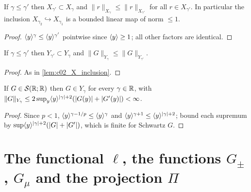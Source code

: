 \begin{lemma}
  \label{lem:c02_X_inclusion}
  If $\gamma\le\gamma'$ then $X_{\gamma'}\subset X_\gamma$ and $\|r\|_{X_\gamma}\le\|r\|_{X_{\gamma'}}$ for all
  $r\in X_{\gamma'}$. In particular the inclusion $X_{\gamma_2}\hookrightarrow X_{\gamma_1}$ is a bounded
  linear map of norm $\le1$.
\end{lemma}
\begin{proof}
  $\langle y \rangle^{\gamma}\le\langle y \rangle^{\gamma'}$ pointwise since $\langle y \rangle\ge1$; all other factors are identical.
\end{proof}

\begin{lemma}
  \label{lem:c02_Y_inclusion}
  If $\gamma\le\gamma'$ then $Y_{\gamma'}\subset Y_\gamma$ and $\|G\|_{Y_\gamma}\le\|G\|_{Y_{\gamma'}}$.
\end{lemma}
\begin{proof}
  As in \cref{lem:c02_X_inclusion}.
\end{proof}

\begin{lemma}
  \label{lem:c02_schwartz_in_Y}
  If $G\in\mathcal S(\mathbb{R};\mathbb{R})$ then $G\in Y_\gamma$ for every $\gamma\in\mathbb{R}$, with
  $\|G\|_{Y_\gamma}\le 2\sup_{y}\langle y \rangle^{|\gamma|+2}(|G(y)|+|G'(y)|)<\infty$.
\end{lemma}
\begin{proof}
  Since $p<1$, $\langle y \rangle^{\gamma-1/p}\le\langle y \rangle^{\gamma}$ and $\langle y \rangle^{\gamma+1}\le\langle y \rangle^{|\gamma|+2}$; bound each
  supremum by $\sup\langle y \rangle^{|\gamma|+2}(|G|+|G'|)$, which is finite for Schwartz $G$.
\end{proof}

\section{The functional $\ell$, the functions $G_\pm$, $G_\mu$ and the projection $\Pi$}

